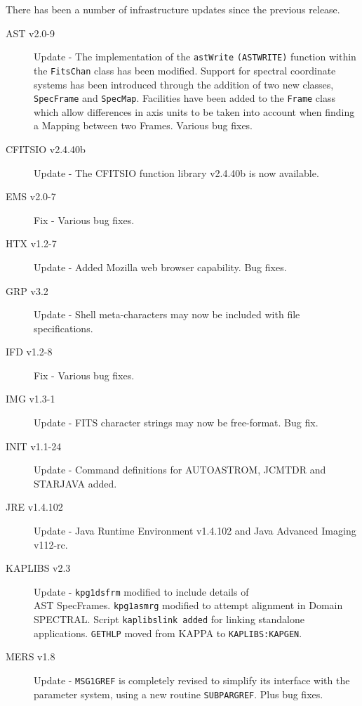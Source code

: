 \documentclass[twoside,11pt]{article}
\renewcommand{\_}{\texttt{\symbol{95}}}
\begin{document}
There has been a number of infrastructure updates since the previous
release.

\begin{description}
\item[AST v2.0-9] Update - The implementation of the \texttt{astWrite} \texttt{(AST\_WRITE)}
function within the \texttt{FitsChan} class has been modified. Support for spectral
coordinate systems has been introduced through the addition of two new classes,
\texttt{SpecFrame} and \texttt{SpecMap}. Facilities have been added to the \texttt{Frame} 
class which allow differences in axis units to be taken into account when finding a Mapping
between two Frames. Various bug fixes.
\item[CFITSIO v2.4.40b] Update - The CFITSIO function library v2.4.40b is now
available.

\item[EMS v2.0-7] Fix - Various bug fixes.

\item[HTX v1.2-7] Update - Added Mozilla web browser capability. Bug fixes.

\item[GRP v3.2] Update - Shell meta-characters may now be included with file
specifications.

\item[IFD v1.2-8] Fix - Various bug fixes.

\item[IMG v1.3-1] Update - FITS character strings may now be free-format. Bug
fix.

\item[INIT v1.1-24] Update - Command definitions for AUTOASTROM, JCMTDR
and STARJAVA added. 

\item[JRE v1.4.1\_02] Update - Java Runtime Environment v1.4.1\_02 and Java 
Advanced Imaging v1\_1\_2-rc.

\item[KAPLIBS v2.3] Update - \texttt{kpg1\_dsfrm} modified to include details of \\
AST SpecFrames. \texttt{kpg1\_asmrg} modified to attempt alignment in Domain SPECTRAL. 
Script \texttt{kaplibs\_link added} for linking standalone applications. \texttt{GETHLP} 
moved from KAPPA to \texttt{KAPLIBS:KAPGEN}.

\item[MERS v1.8] Update - \texttt{MSG1\_GREF} is completely revised to simplify its interface 
with the parameter system, using a new routine \texttt{SUBPAR\_GREF}. Plus bug fixes.


\end{description}
\end{document}
